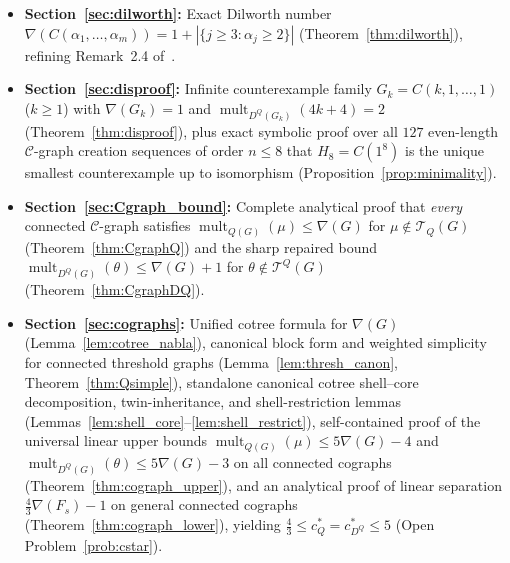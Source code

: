 \documentclass[11pt,a4paper]{article}
\theoremstyle{definition}
\DeclareMathOperator{\mult}{mult}
\begin{document}
\begin{itemize}
  \item \textbf{Section~\ref{sec:dilworth}:} Exact Dilworth number $\nabla(C(\alpha_1,\dots,\alpha_m)) = 1 + |\{j \ge 3 : \alpha_j \ge 2\}|$ (Theorem~\ref{thm:dilworth}), refining Remark~2.4 of~\cite{MMT2026}.
  \item \textbf{Section~\ref{sec:disproof}:} Infinite counterexample family $G_k = C(k,1,\dots,1)$ ($k \ge 1$) with $\nabla(G_k)=1$ and $\mult_{D^Q(G_k)}(4k+4) = 2$ (Theorem~\ref{thm:disproof}), plus exact symbolic proof over all $127$ even-length $\mathcal{C}$-graph creation sequences of order $n \le 8$ that $H_8 = C(1^8)$ is the unique smallest counterexample up to isomorphism (Proposition~\ref{prop:minimality}).
  \item \textbf{Section~\ref{sec:Cgraph_bound}:} Complete analytical proof that \emph{every} connected $\mathcal{C}$-graph satisfies $\mult_{Q(G)}(\mu) \le \nabla(G)$ for $\mu \notin \mathcal{T}_Q(G)$ (Theorem~\ref{thm:CgraphQ}) and the sharp repaired bound $\mult_{D^Q(G)}(\theta) \le \nabla(G) + 1$ for $\theta \notin \mathcal{T}^Q(G)$ (Theorem~\ref{thm:CgraphDQ}).
  \item \textbf{Section~\ref{sec:cographs}:} Unified cotree formula for $\nabla(G)$ (Lemma~\ref{lem:cotree_nabla}), canonical block form and weighted simplicity for connected threshold graphs (Lemma~\ref{lem:thresh_canon}, Theorem~\ref{thm:Qsimple}), standalone canonical cotree shell--core decomposition, twin-inheritance, and shell-restriction lemmas (Lemmas~\ref{lem:shell_core}--\ref{lem:shell_restrict}), self-contained proof of the universal linear upper bounds $\mult_{Q(G)}(\mu) \le 5\nabla(G) - 4$ and $\mult_{D^Q(G)}(\theta) \le 5\nabla(G) - 3$ on all connected cographs (Theorem~\ref{thm:cograph_upper}), and an analytical proof of linear separation $\frac{4}{3}\nabla(F_s) - 1$ on general connected cographs (Theorem~\ref{thm:cograph_lower}), yielding $\frac{4}{3} \le c_Q^* = c_{D^Q}^* \le 5$ (Open Problem~\ref{prob:cstar}).
\end{itemize}
\end{document}
